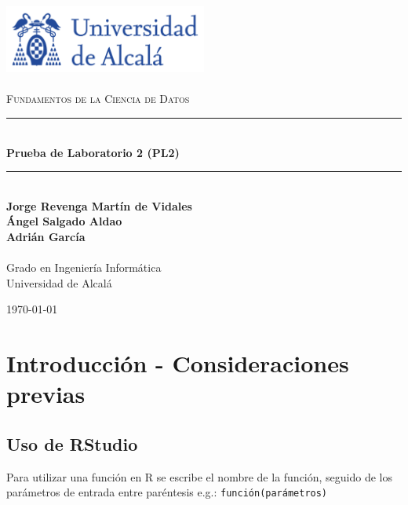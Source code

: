 \documentclass[a4paper, 12pt]{article}
\newcommand{\HRule}{\rule{\linewidth}{0.5mm}}
\begin{document}

	\begin{titlepage}
		\begin{center}
			\includegraphics[width=0.5\textwidth]{logoUAH.png}~\\[2cm]
			
			\textsc{\Large \\Fundamentos de la Ciencia de Datos}\\[2cm]
			
			\HRule \\[0.4cm]
			{\LARGE \bfseries Prueba de Laboratorio 2 (PL2) \\[0.4cm]}
			\HRule \\[2cm]
			
			\large\textbf{Jorge Revenga Martín de Vidales}\\
			\large\textbf{Ángel Salgado Aldao}\\
			\large\textbf{Adrián García}\\
			\large\textbf{}\\ Grado en Ingeniería Informática \\ Universidad de Alcalá
			
			\vfill
			
			{\large \today}
		\end{center}
	\end{titlepage}
	\pagestyle{fancy}
	\fancyhf{} %
	\fancyfoot[RO,LE]{\thepage}  %
	\newpage
	
	\thispagestyle{plain}
	\tableofcontents
	
	
	\newpage
	
	\section{Introducción - Consideraciones previas}
	
	\subsection{Uso de RStudio}
	Para utilizar una función en R se escribe el nombre de la función, seguido de los parámetros de entrada entre paréntesis e.g.: \texttt{función(parámetros)}
	
\end{document}

